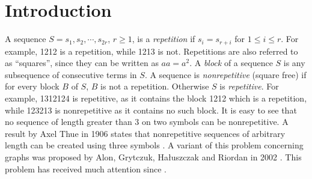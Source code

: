 \documentclass{patmorin}
\begin{document}
\section{Introduction}
A sequence $S=s_1,s_2,\cdots,s_{2r}$, $r\ge 1$, is a \emph{repetition}
if $s_i=s_{r+i}$ for $1 \leq i \leq r$. For example, 1212 is a
repetition, while 1213 is not. Repetitions are also referred to as
``squares'', since they can be written as $aa=a^2$. A \emph{block}
of a sequence $S$ is any subsequence of consecutive terms in $S$. A
sequence is \emph{nonrepetitive} (square free) if for every block $B$
of $S$, $B$ is not a repetition. Otherwise $S$ is \emph{repetitive}. For
example, 1312124 is repetitive, as it contains the block 1212 which is a
repetition, while 123213 is nonrepetitive as it contains no such block.
It is easy to see that no sequence of length greater than 3 on two symbols
can be nonrepetitive. A result by Axel Thue in 1906 states
that nonrepetitive sequences of arbitrary length can be created using
three symbols \cite{thue1906uber}. A variant of this problem concerning
graphs was proposed by Alon, Grytczuk, Ha{\l}uszczak and Riordan in
2002 \cite{alon2002nonrepetitive}. This problem has received much
attention since \cite{barat2013facial, barat2007square, barat2008note,
brevsar2007nonrepetitive, currie2002cycle18, dujmovic2012planarlogn,
dujmovic2011nonrepetitive, fiorenzi2011thue, gonccalves2014entropy,
grytczuk2007nonrepetitivesurvey, grytczuk2007nonrepetitive,
grytczuk2013new, harant2012nonrepetitive, kozik2013nonrepetitive,
kundgen2008nonrepetitive, pezarski2009non, schreyer2012facial,
schreyer2013total}. 
\end{document}
